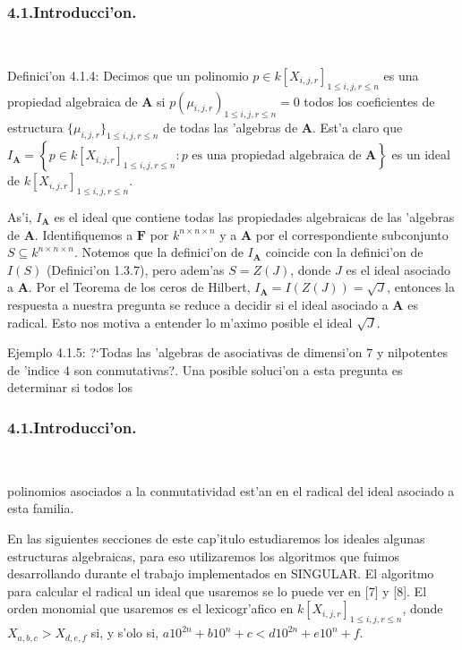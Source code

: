 \documentclass[10pt]{beamer}
\begin{document}
\begin{frame}
\frametitle{4.1.Introducci'on.}\\
\begin{block}{Definici'on 4.1.4:}
Decimos que un polinomio $p \in k[X_{i,j,r}]_{1 \leq i,j,r \leq n}$ es una propiedad algebraica de $\textbf{A}$ si $p(\mu_{i,j,r})_{1 \leq i,j,r \leq n}=0$ todos los coeficientes de estructura $\{\mu_{i,j,r}\}_{1 \leq i,j,r \leq n}$ de todas las 'algebras de $\textbf{A}$. Est'a claro que $I_{\textbf{A}}=\left\{ p \in k[X_{i,j,r}]_{1 \leq i,j,r \leq n}:p\text{ es una propiedad algebraica de }\textbf{A} \right\}$ es un ideal de $k[X_{i,j,r}]_{1 \leq i,j,r \leq n}$.\\
\end{block}

As'i, $I_{\textbf{A}}$ es el ideal que contiene todas las propiedades algebraicas de las 'algebras de $\textbf{A}$. Identifiquemos a $\textbf{F}$ por $k^{n \times n \times n}$ y a $\textbf{A}$ por el correspondiente subconjunto $S \subseteq k^{n \times n \times n}$. Notemos que la definici'on de $I_{\textbf{A}}$ coincide con la definici'on de $I(S)$ (Definici'on 1.3.7), pero adem'as $S=Z(J)$, donde $J$ es el ideal asociado a $\textbf{A}$. Por el Teorema de los ceros de Hilbert, $I_{\textbf{A}}=I(Z(J))=\sqrt{J}$, entonces la respuesta a nuestra pregunta se reduce a decidir si el ideal asociado a $\textbf{A}$ es radical. Esto nos motiva a entender lo m'aximo posible el ideal $\sqrt{J}$.\\
\begin{block}{Ejemplo 4.1.5:}
?`Todas las 'algebras de asociativas de dimensi'on $7$ y nilpotentes de 'indice $4$ son conmutativas?. Una posible soluci'on a esta pregunta es determinar si todos los\\   
\end{block}
\end{frame}

\begin{frame}
\frametitle{4.1.Introducci'on.}\\
\begin{block}{}
polinomios asociados a la conmutatividad est'an en el radical del ideal asociado a esta familia.
\end{block}

En las siguientes secciones de este cap'itulo estudiaremos los ideales algunas estructuras algebraicas, para eso utilizaremos los algoritmos que fuimos desarrollando durante el trabajo implementados en SINGULAR. El algoritmo para calcular el radical un ideal que usaremos se lo puede ver en [7] y [8]. El orden monomial que usaremos es el lexicogr'afico en $k[X_{i,j,r}]_{1 \leq i,j,r \leq n}$, donde $X_{a,b,c}>X_{d,e,f}$ si, y s'olo si, $a10^{2n}+b10^n+c<d10^{2n}+e10^n+f$.\\
\vspace{4cm}
\end{frame}
\end{document}
